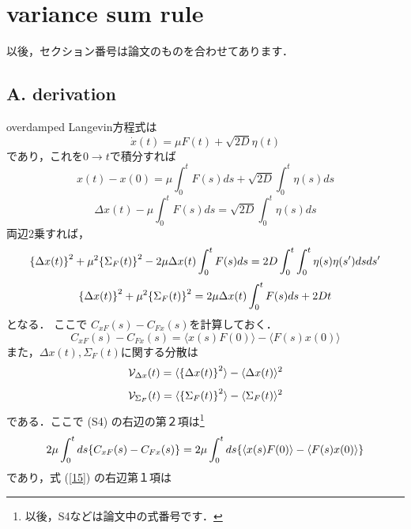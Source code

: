 \documentclass{jsarticle}
\numberwithin{equation}{section}
\theoremstyle{definition}
\begin{document}
\section{variance sum rule}
以後，セクション番号は論文のものを合わせてあります．
\subsection{A. derivation}
overdamped Langevin方程式は
\begin{equation}
  \dot{x}(t) = \mu F(t) + \sqrt{2D} \eta(t)
\end{equation}
であり，これを$0 \to t$で積分すれば
\begin{equation}
  x(t) - x(0) = \mu \int_0^t F(s) ds + \sqrt{2D} \int_0^t \eta(s)ds
\end{equation}
\begin{equation}
  \label{13}
  \Delta x(t) - \mu \int_0^t F(s) ds = \sqrt{2D} \int_0^t \eta(s)ds 
\end{equation}
両辺2乗すれば，
\begin{equation}
  \qty{ \Delta x(t) } ^2 + \mu^2 \qty{\Sigma_F (t)} ^2 - 2\mu \Delta x(t) \int_0^t F(s) ds = 2D \int_0^t \int_0^t \eta(s) \eta(s') dsds'
\end{equation}
\begin{equation}
  \label{15}
  \qty{ \Delta x(t) } ^2 + \mu^2 \qty{\Sigma_F (t)} ^2 = 2\mu \Delta x(t) \int_0^t F(s) ds + 2Dt
\end{equation}
となる．
ここで $C_{xF} (s) - C_{Fx} (s)$を計算しておく．
\begin{equation}
  C_{xF} (s) - C_{Fx} (s) = \langle x(s)F(0) \rangle - \langle F(s)x(0) \rangle
\end{equation}
また，$\Delta x(t), \Sigma_F (t)$に関する分散は
\begin{equation}
  \mathcal{V} _{\Delta x} (t) = \langle \qty{ \Delta x(t) } ^2 \rangle - \langle \Delta x(t) \rangle^2
\end{equation}
\begin{equation}
  \mathcal{V} _{\Sigma_F} (t) = \langle \qty{ \Sigma_F (t) } ^2 \rangle - \langle \Sigma_F (t) \rangle^2
\end{equation}
である．ここで (S4) の右辺の第２項は\footnote{以後，S4などは論文中の式番号です．}
\begin{equation}
  2 \mu \int_0^t ds \qty{ C_{xF} (s) - C_{Fx} (s) } = 2 \mu \int_0^t ds \qty{ \langle x(s)F(0) \rangle - \langle F(s)x(0) \rangle }
\end{equation}
であり，式 (\ref{15}) の右辺第１項は
\end{document}
